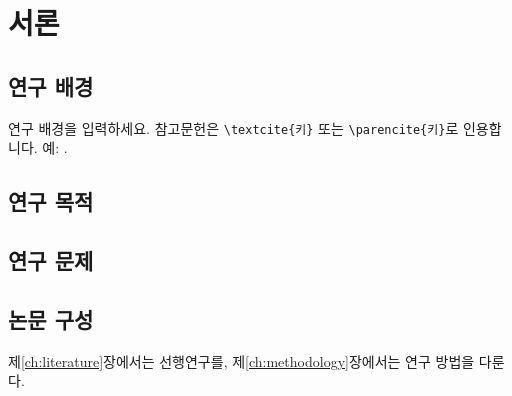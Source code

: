 \chapter{서론}
\label{ch:introduction}

\section{연구 배경}
\label{sec:background}

연구 배경을 입력하세요. 참고문헌은 \verb|\textcite{키}| 또는 \verb|\parencite{키}|로
인용합니다. 예: \textcite{sweeten2018digital}.

\section{연구 목적}
\label{sec:purpose}

\section{연구 문제}
\label{sec:questions}

\section{논문 구성}
\label{sec:outline}

제\ref{ch:literature}장에서는 선행연구를, 제\ref{ch:methodology}장에서는
연구 방법을 다룬다.
